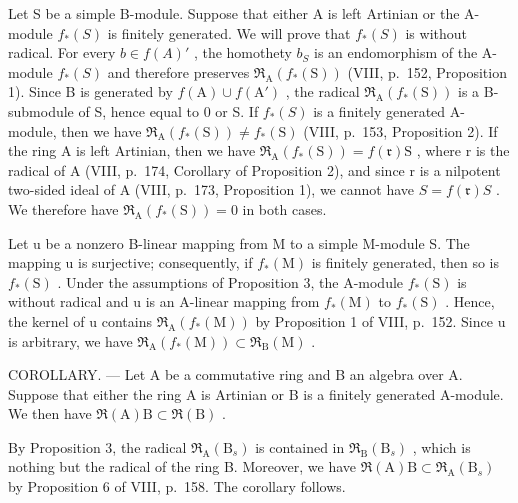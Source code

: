 Let S be a simple B-module. Suppose that either A is left Artinian or the A-module \(f_{*}(S)\) is finitely generated. We will prove that \(f_{*}(S)\) is without radical. For every \(b \in f(A)'\) , the homothety \(b_{S}\) is an endomorphism of the A-module \(f_{*}(S)\) and therefore preserves \(\mathfrak{R}_{\mathrm{A}}(f_{*}(\mathrm{S}))\) (VIII, p.~152, Proposition 1). Since B is generated by \(f(\mathrm{A}) \cup f(\mathrm{A}')\) , the radical \(\mathfrak{R}_{\mathrm{A}}(f_{*}(\mathrm{S}))\) is a B-submodule of S, hence equal to 0 or S. If \(f_{*}(S)\) is a finitely generated A-module, then we have \(\mathfrak{R}_{\mathrm{A}}(f_{*}(\mathrm{S})) \neq f_{*}(\mathrm{S})\) (VIII, p.~153, Proposition 2). If the ring A is left Artinian, then we have \(\mathfrak{R}_{\mathrm{A}}(f_{*}(\mathrm{S})) = f(\mathfrak{r})\mathrm{S}\) , where r is the radical of A (VIII, p.~174, Corollary of Proposition 2), and since r is a nilpotent two-sided ideal of A (VIII, p.~173, Proposition 1), we cannot have \(S = f(\mathfrak{r})S\) . We therefore have \(\mathfrak{R}_{\mathrm{A}}(f_{*}(\mathrm{S})) = 0\) in both cases.

Let u be a nonzero B-linear mapping from M to a simple M-module S. The mapping u is surjective; consequently, if \(f_{*}(\mathrm{M})\) is finitely generated, then so is \(f_{*}(\mathrm{S})\) . Under the assumptions of Proposition 3, the A-module \(f_{*}(\mathrm{S})\) is without radical and u is an A-linear mapping from \(f_{*}(\mathrm{M})\) to \(f_{*}(\mathrm{S})\) . Hence, the kernel of u contains \(\mathfrak{R}_{\mathrm{A}}(f_{*}(\mathrm{M}))\) by Proposition 1 of VIII, p.~152. Since u is arbitrary, we have \(\mathfrak{R}_{\mathrm{A}}(f_{*}(\mathrm{M})) \subset \mathfrak{R}_{\mathrm{B}}(\mathrm{M})\) .

COROLLARY. --- Let A be a commutative ring and B an algebra over A. Suppose that either the ring A is Artinian or B is a finitely generated A-module. We then have \(\Re(\mathrm{A})\mathrm{B}\subset\Re(\mathrm{B})\) .

By Proposition 3, the radical \(\mathfrak{R}_{\mathrm{A}}(\mathrm{B}_{s})\) is contained in \(\mathfrak{R}_{\mathrm{B}}(\mathrm{B}_{s})\) , which is nothing but the radical of the ring B. Moreover, we have \(\mathfrak{R}(\mathrm{A})\mathrm{B}\subset\mathfrak{R}_{\mathrm{A}}(\mathrm{B}_{s})\) by Proposition 6 of VIII, p.~158. The corollary follows.

